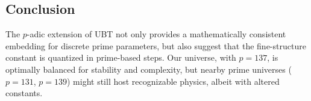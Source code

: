 \subsection*{Conclusion}
The $p$-adic extension of UBT not only provides a mathematically consistent embedding for discrete prime parameters, but also suggest that the fine-structure constant is quantized in prime-based steps. Our universe, with $p=137$, is optimally balanced for stability and complexity, but nearby prime universes ($p=131$, $p=139$) might still host recognizable physics, albeit with altered constants.
